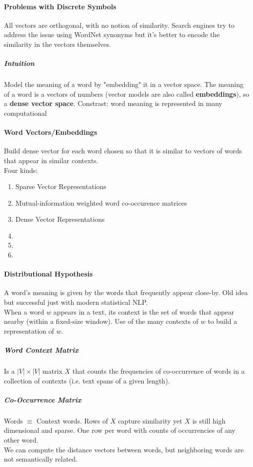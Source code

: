 \documentclass[10pt]{report}
\begin{document}
\paragraph{Problems with Discrete Symbols} All vectors are orthogonal, with no notion of similarity. Search engines try to address the issue using WordNet synonyms but it's better to encode the similarity in the vectors themselves.
\subparagraph{Intuition} Model the meaning of a word by "embedding" it in a vector space. The meaning of a word is a vectors of numbers (vector models are also called \textbf{embeddings}), so a \textbf{dense vector space}. Constrast: word meaning is represented in many computational %
\paragraph{Word Vectors/Embeddings} Build dense vector for each word chosen so that it is similar to vectors of words that appear in similar contexts.\\
Four kinds:\begin{enumerate}
	\item[] Sparse Vector Representations
	\item Mutual-information weighted word co-occurence matrices
	\item[] Dense Vector Representations
	\item %
	\item 
	\item 
\end{enumerate}
\paragraph{Distributional Hypothesis} A word's meaning is given by the words that frequently appear close-by. Old idea but successful just with modern statistical NLP.\\
When a word $w$ appears in a text, its context is the set of words that appear nearby (within a fixed-size window). Use of the many contexts of $w$ to build a representation of $w$.
\subparagraph{Word Context Matrix} Is a $|V|\times|V|$ matrix $X$ that counts the frequencies of co-occurrence of words in a collection of contexts (i.e. text spans of a given length).
\subparagraph{Co-Occurrence Matrix} Words $\equiv$ Context words. Rows of $X$ capture similarity yet $X$ is still high dimensional and sparse. One row per word with counts of occurrencies of any other word.\\
We can compute the distance vectors between words, but neighboring words are not semantically related.
\end{document}

